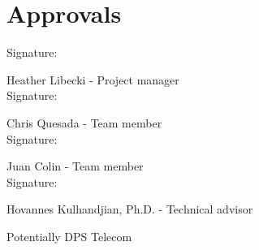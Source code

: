 \section{Approvals}
\setlength{\parindent}{15ex}
	\begin{flushleft}
	Signature: \hrulefill
	
	\hspace*{0mm}\phantom{Approved: }Heather Libecki - Project manager\\
	\vspace{12pt}
	Signature: \hrulefill
	
	\hspace*{0mm}\phantom{Approved: }Chris Quesada - Team member\\
	\vspace{12pt}
	Signature: \hrulefill
	
	\hspace*{0mm}\phantom{Approved: }Juan Colin - Team member\\
	\vspace{12pt}
	Signature: \hrulefill
	
	\hspace*{0mm}\phantom{Approved: }Hovannes Kulhandjian, Ph.D. -
	 Technical advisor\\
	 \vspace{12pt}
	
	Potentially DPS Telecom
\end{flushleft}\par

\cite{de1}
\cite{SM}
\cite{SMD}


	
		
 

